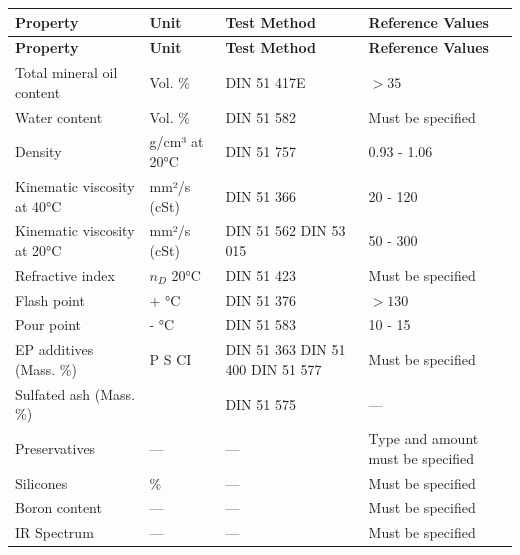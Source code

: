 \renewcommand{\arraystretch}{1.3}
\begin{longtable}{|p{6cm}|p{3cm}|p{3.5cm}|p{3.5cm}|}
    \hline
    \textbf{Property} & \textbf{Unit} & \textbf{Test Method} & \textbf{Reference Values} \\
    \hline
    \endfirsthead

    \hline
    \textbf{Property} & \textbf{Unit} & \textbf{Test Method} & \textbf{Reference Values} \\
    \hline
    \endhead

    \hline
    \endfoot

    \hline
    \endlastfoot

    Total mineral oil content & Vol. \% & DIN 51 417E & $> 35$ \\
    \hline
    Water content & Vol. \% & DIN 51 582 & Must be specified \\
    \hline
    Density & g/cm³ at 20°C & DIN 51 757 & 0.93 - 1.06 \\
    \hline
    Kinematic viscosity at 40°C & mm²/s (cSt) & DIN 51 366 & 20 - 120 \\
    \hline
    Kinematic viscosity at 20°C & mm²/s (cSt) & DIN 51 562 \newline DIN 53 015 & 50 - 300 \\
    \hline
    Refractive index & $n_D$ 20°C & DIN 51 423 & Must be specified \\
    \hline
    Flash point & + °C & DIN 51 376 & $> 130$ \\
    \hline
    Pour point & - °C & DIN 51 583 & 10 - 15 \\
    \hline
    EP additives (Mass. \%) & P \newline S \newline CI & DIN 51 363 \newline DIN 51 400 \newline DIN 51 577 & Must be specified \\
    \hline
    Sulfated ash (Mass. \%) &  & DIN 51 575 & --- \\
    \hline
    Preservatives & --- & --- & Type and amount must be specified \\
    \hline
    Silicones & \% & --- & Must be specified \\
    \hline
    Boron content & --- & --- & Must be specified \\
    \hline
    IR Spectrum & --- & --- & Must be specified \\
    \hline
\end{longtable}
\newpage

